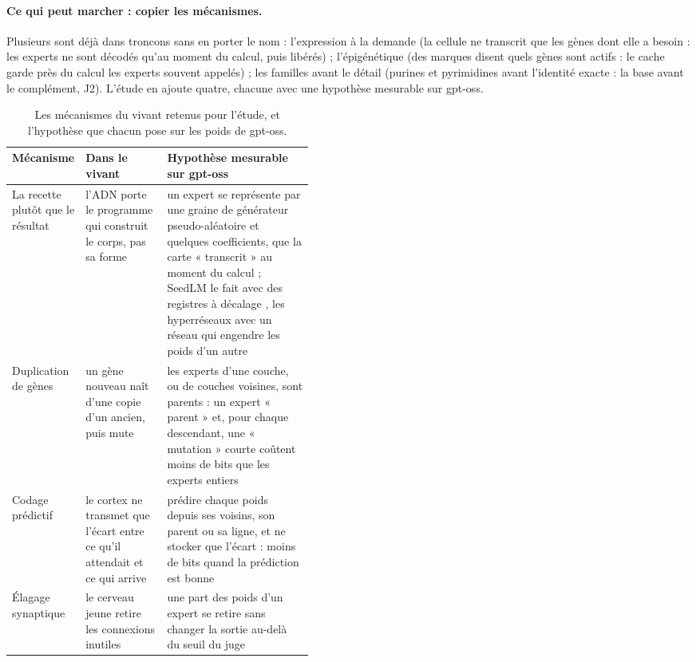 \paragraph{Ce qui peut marcher : copier les mécanismes.} Plusieurs sont déjà dans troncons sans en porter le nom : l'expression à la demande (la cellule ne transcrit que les gènes dont elle a besoin : les experts ne sont décodés qu'au moment du calcul, puis libérés) ; l'épigénétique (des marques disent quels gènes sont actifs : le cache garde près du calcul les experts souvent appelés) ; les familles avant le détail (purines et pyrimidines avant l'identité exacte : la base avant le complément, J2). L'étude en ajoute quatre, chacune avec une hypothèse mesurable sur gpt-oss.

\begin{table}[ht]
\centering\footnotesize
\caption[Les mécanismes du vivant et leurs hypothèses mesurables]{Les mécanismes du vivant retenus pour l'étude, et l'hypothèse que chacun pose sur les poids de gpt-oss.}
\label{t2d-tab:genome}
\begin{tabularx}{\linewidth}{@{}>{\raggedright\arraybackslash}p{0.17\linewidth}>{\raggedright\arraybackslash}p{0.27\linewidth}>{\raggedright\arraybackslash}X@{}}
\toprule
Mécanisme & Dans le vivant & Hypothèse mesurable sur gpt-oss \\
\midrule
La recette plutôt que le résultat & l'ADN porte le programme qui construit le corps, pas sa forme & un expert se représente par une graine de générateur pseudo-aléatoire et quelques coefficients, que la carte « transcrit » au moment du calcul ; SeedLM le fait avec des registres à décalage \cite{shafipour2024seedlm}, les hyperréseaux avec un réseau qui engendre les poids d'un autre \cite{ha2016hypernetworks} \\
Duplication de gènes & un gène nouveau naît d'une copie d'un ancien, puis mute \cite{ohno1970} & les experts d'une couche, ou de couches voisines, sont parents : un expert « parent » et, pour chaque descendant, une « mutation » courte coûtent moins de bits que les experts entiers \\
Codage prédictif & le cortex ne transmet que l'écart entre ce qu'il attendait et ce qui arrive \cite{rao1999} & prédire chaque poids depuis ses voisins, son parent ou sa ligne, et ne stocker que l'écart : moins de bits quand la prédiction est bonne \\
Élagage synaptique & le cerveau jeune retire les connexions inutiles \cite{huttenlocher1979} & une part des poids d'un expert se retire sans changer la sortie au-delà du seuil du juge \cite{lecun1989obd,han2015deepcompression} \\
\bottomrule
\end{tabularx}
\end{table}

